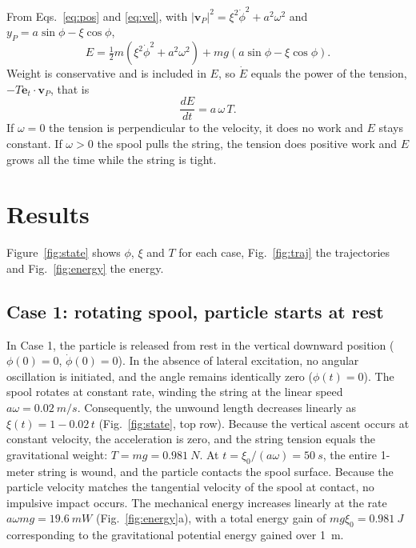 \documentclass[11pt,a4paper]{article}
\newcommand{\dt}[1]{\dot{#1}}
\newcommand{\et}{\bm{e}_t}
\begin{document}
From Eqs.~\eqref{eq:pos} and \eqref{eq:vel}, with $|\bm v_P|^2=\xi^2\dt\phi^2+a^2\omega^2$ and $y_P=a\sin\phi-\xi\cos\phi$,
\begin{equation}
E=\tfrac12 m\left(\xi^{2}\dt{\phi}^{2}+a^{2}\omega^{2}\right)+mg\left(a\sin\phi-\xi\cos\phi\right).
\label{eq:E}
\end{equation}
Weight is conservative and is included in $E$, so $\dt E$ equals the power of the tension, $-T\et\cdot\bm v_P$, that is
\begin{equation}
\frac{dE}{d t}=a\,\omega\,T .
\label{eq:Edot}
\end{equation}
If $\omega=0$ the tension is perpendicular to the velocity, it does no work and $E$ stays constant. If $\omega>0$ the spool pulls the string, the tension does positive work and $E$ grows all the time while the string is tight.

\clearpage

\section{Results}\label{sec:results}
Figure~\ref{fig:state} shows $\phi$, $\xi$ and $T$ for each case, Fig.~\ref{fig:traj} the trajectories and Fig.~\ref{fig:energy} the energy.

\subsection{Case 1: rotating spool, particle starts at rest}
In Case 1, the particle is released from rest in the vertical downward position ($\phi(0)=0$, $\dt\phi(0)=0$). In the absence of lateral excitation, no angular oscillation is initiated, and the angle remains identically zero ($\phi(t)=0$). The spool rotates at constant rate, winding the string at the linear speed $a\omega = \SI{0.02}{m/s}$. Consequently, the unwound length decreases linearly as $\xi(t) = 1 - 0.02\,t$ (Fig.~\ref{fig:state}, top row). Because the vertical ascent occurs at constant velocity, the acceleration is zero, and the string tension equals the gravitational weight: $T = mg = \SI{0.981}{N}$. At $t = \xi_0/(a\omega) = \SI{50}{s}$, the entire 1-meter string is wound, and the particle contacts the spool surface. Because the particle velocity matches the tangential velocity of the spool at contact, no impulsive impact occurs. The mechanical energy increases linearly at the rate $a\omega mg = \SI{19.6}{mW}$ (Fig.~\ref{fig:energy}a), with a total energy gain of $mg\xi_0 = \SI{0.981}{J}$ corresponding to the gravitational potential energy gained over \SI{1}{m}.
\end{document}
